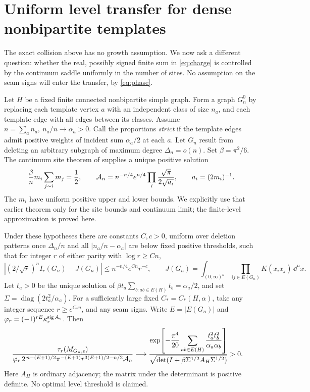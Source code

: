 \section{Uniform level transfer for dense nonbipartite templates}
\label{sec:joint}
The exact collision above has no growth assumption. We now ask a different question: whether the real, possibly signed finite sum in \eqref{eq:charge} is controlled by the continuum saddle uniformly in the number of sites. No assumption on the seam signs will enter the transfer, by \eqref{eq:phase}.

Let \(H\) be a fixed finite connected nonbipartite simple graph. Form a graph \(G_n^0\) by replacing each template vertex \(a\) with an independent class of size \(n_a\), and each template edge with all edges between its classes. Assume \(n=\sum_a n_a,\ n_a/n\to\alpha_a>0\). Call the proportions \emph{strict} if the template edges admit positive weights of incident sum \(\alpha_a/2\) at each \(a\). Let \(G_n\) result from deleting an arbitrary subgraph of maximum degree \(\Delta_n=o(n)\). Set \(\beta=\pi^2/6\). The continuum site theorem of \cite[Theorem~5.1]{P50} supplies a unique positive solution
\begin{equation}
 \frac{\beta}{n}m_i\sum_{j\sim i}m_j=\frac12,\qquad
  {\cal A}_n=n^{-n/4}e^{n/4}
                    \prod_i\frac{\sqrt\pi}{2\sqrt{a_i}},\qquad
  a_i=(2m_i)^{-1}.
 \label{eq:site}
\end{equation}
The \(m_i\) have uniform positive upper and lower bounds. We explicitly use that earlier theorem only for the site bounds and continuum limit; the finite-level approximation is proved here.

\begin{theorem}
\label{thm:joint}
Under these hypotheses there are constants \(C,c>0\), uniform over deletion patterns once \(\Delta_n/n\) and all \(|n_a/n-\alpha_a|\) are below fixed positive thresholds, such that for integer \(r\) of either parity with \(\log r\ge Cn\),
\begin{equation}
 \left|(2/\sqrt r)^nI_r(G_n)-J(G_n)\right|
            \le n^{-n/4}e^{Cn}r^{-c},\qquad
 J(G_n)=\int_{(0,\infty)^n}\prod_{ij\in E(G_n)}K(x_ix_j)\,\dd^n x .
 \label{eq:transfer}
\end{equation}
Let \(t_a>0\) be the unique solution of
\(\beta t_a\sum_{b:ab\in E(H)}t_b=\alpha_a/2\), and set \(\Sigma=\operatorname{diag}(2t_a^2/\alpha_a)\). For a sufficiently large fixed \(C_*=C_*(H,\alpha)\), take any integer sequence \(r\ge e^{C_*n}\), and any seam signs. Write \(E=|E(G_n)|\) and \(\varphi_r=(-1)^{rE}\kappa_r^{\operatorname{sig} A_\epsilon}\). Then
\begin{align}
 \frac{\tau_r(M_{G_n,\epsilon})}
 {\varphi_r\,2^{\,n-(E+1)/2}\pi^{-(E+1)}
         r^{3(E+1)/2-n/2}{\cal A}_n}
 &\longrightarrow
 \frac{\displaystyle
    \exp\!\left[-\frac{\pi^4}{20}
       \sum_{ab\in E(H)}\frac{t_a^2t_b^2}{\alpha_a\alpha_b}\right]}
 {\sqrt{\det(I+\beta\Sigma^{1/2} A_H\Sigma^{1/2})}}>0 .
 \label{eq:joint}
\end{align}
Here \(A_H\) is ordinary adjacency; the matrix under the determinant is positive definite. No optimal level threshold is claimed.
\end{theorem}

